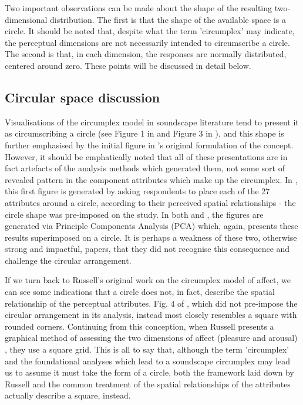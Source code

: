 Two important observations can be made about the shape of the resulting two-dimensional distribution. The first is that the shape of the available space is a circle. It should be noted that, despite what the term 'circumplex' may indicate, the perceptual dimensions are not necessarily intended to circumscribe a circle. The second is that, in each dimension, the responses are normally distributed, centered around zero. These points will be discussed in detail below.

\subsection{Circular space discussion}
Visualisations of the circumplex model in soundscape literature tend to present it as circumscribing a circle (see Figure 1 in \citep{Axelsson2010principal} and Figure 3 in \citep{Torresin2020Indoor}), and this shape is further emphasised by the initial figure in \citet{Russell1980circumplex}'s original formulation of the concept. However, it should be emphatically noted that all of these presentations are in fact artefacts of the analysis methods which generated them, not some sort of revealed pattern in the component attributes which make up the circumplex. In \citet{Russell1980circumplex}, this first figure is generated by asking respondents to place each of the 27 attributes around a circle, according to their perceived spatial relationships - the circle shape was pre-imposed on the study. In both \citet{Axelsson2010principal} and \citet{Torresin2020Indoor}, the figures are generated via Principle Components Analysis (PCA) which, again, presents these results superimposed on a circle. It is perhaps a weakness of these two, otherwise strong and impactful, papers, that they did not recognise this consequence and challenge the circular arrangement.

If we turn back to Russell's original work on the circumplex model of affect, we can see some indications that a circle does not, in fact, describe the spatial relationship of the perceptual attributes. Fig. 4 of \citep{Russell1980circumplex}, which did not pre-impose the circular arrangement in its analysis, instead most closely resembles a square with rounded corners. Continuing from this conception, when Russell presents a graphical method of assessing the two dimensions of affect (pleasure and arousal) \citep{Russell1989Affect}, they use a square grid. This is all to say that, although the term 'circumplex' and the foundational analyses which lead to a soundscape circumplex may lead us to assume it must take the form of a circle, both the framework laid down by Russell and the common treatment of the spatial relationships of the attributes actually describe a square, instead.

